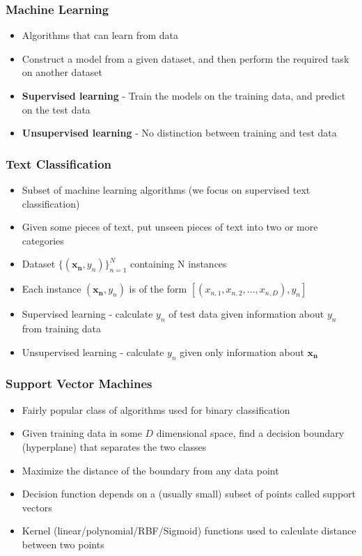 \documentclass{beamer}
\begin{document}
    \begin{frame}
        \frametitle{Machine Learning}
        \begin{itemize}
            \item{Algorithms that can learn from data}
            \item{Construct a model from a given dataset, and then perform the required task on another dataset}
            \item{\textbf{Supervised learning} - Train the models on the training data, and predict on the test data}
            \item{\textbf{Unsupervised learning} - No distinction between training and test data}
        \end{itemize}
    \end{frame}
    
    \begin{frame}
        \frametitle{Text Classification}
        \begin{itemize}
            \item{Subset of machine learning algorithms (we focus on supervised text classification)}
            \item{Given some pieces of text, put unseen pieces of text into two or more categories}
            \item{Dataset $\{(\mathbf{x_n}, y_n)\}_{n = 1}^{N}$ containing N instances}
            \item{Each instance $(\mathbf{x_n}, y_n)$ is of the form $[(x_{n, 1}, x_{n, 2}, ..., x_{n, D}), y_n]$}
            \item{Supervised learning - calculate $y_n$ of test data given information about $y_n$ from training data}
            \item{Unsupervised learning - calculate $y_n$ given only information about $\mathbf{x_n}$}
        \end{itemize}
    \end{frame}
    
    \begin{frame}
        \frametitle{Support Vector Machines}
        \begin{itemize}
            \item{Fairly popular class of algorithms used for binary classification}
            \item{Given training data in some $D$ dimensional space, find a decision boundary (hyperplane) that separates the two classes}
            \item{Maximize the distance of the boundary from any data point}
            \item{Decision function depends on a (usually small) subset of points called support vectors}
            \item{Kernel (linear/polynomial/RBF/Sigmoid) functions used to calculate distance between two points}
        \end{itemize}
    \end{frame}
    
\end{document}
